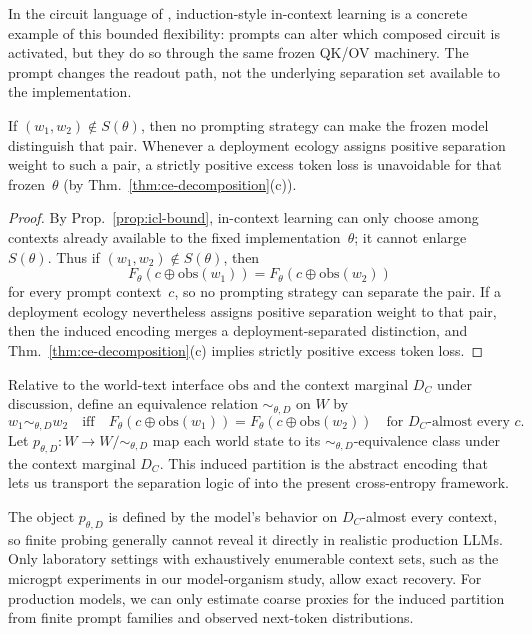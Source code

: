 \documentclass[twoside,11pt]{article}
\newcommand{\thmref}[1]{Thm.~\ref{#1}}
\newcommand{\propref}[1]{Prop.~\ref{#1}}
\begin{document}
In the circuit language of \citet{elhage_etal_2021_framework}, induction-style in-context learning is a concrete example of this bounded flexibility: prompts can alter which composed circuit is activated, but they do so through the same frozen QK/OV machinery. The prompt changes the readout path, not the underlying separation set available to the implementation.

\begin{corollary}
If $(w_1,w_2) \notin S(\theta)$, then no prompting strategy can make the frozen model distinguish that pair. Whenever a deployment ecology assigns positive separation weight to such a pair, a strictly positive excess token loss is unavoidable for that frozen~$\theta$ (by \thmref{thm:ce-decomposition}(c)).
\end{corollary}

\begin{proof}
By \propref{prop:icl-bound}, in-context learning can only choose among contexts already available to the fixed implementation~$\theta$; it cannot enlarge~$S(\theta)$. Thus if $(w_1,w_2)\notin S(\theta)$, then
\[
F_\theta(c\oplus \mathrm{obs}(w_1)) = F_\theta(c\oplus \mathrm{obs}(w_2))
\]
for every prompt context~$c$, so no prompting strategy can separate the pair. If a deployment ecology nevertheless assigns positive separation weight to that pair, then the induced encoding merges a deployment-separated distinction, and \thmref{thm:ce-decomposition}(c) implies strictly positive excess token loss.
\end{proof}

\begin{definition}\label{def:model-encoding}
Relative to the world-text interface $\mathrm{obs}$ and the context marginal $D_C$ under discussion, define an equivalence relation $\sim_{\theta,D}$ on $W$ by
\[
w_1 \sim_{\theta,D} w_2
\quad\text{iff}\quad
F_\theta(c \oplus \mathrm{obs}(w_1)) = F_\theta(c \oplus \mathrm{obs}(w_2))
\quad \text{for } D_C\text{-almost every } c.
\]
Let $p_{\theta,D} \colon W \to W/{\sim_{\theta,D}}$ map each world state to its $\sim_{\theta,D}$-equivalence class under the context marginal $D_C$. This induced partition is the abstract encoding that lets us transport the separation logic of \citet{dallariva_2026} into the present cross-entropy framework.
\end{definition}

The object $p_{\theta,D}$ is defined by the model's behavior on $D_C$-almost every context, so finite probing generally cannot reveal it directly in realistic production LLMs. Only laboratory settings with exhaustively enumerable context sets, such as the microgpt experiments in our model-organism study, allow exact recovery. For production models, we can only estimate coarse proxies for the induced partition from finite prompt families and observed next-token distributions.
\end{document}

